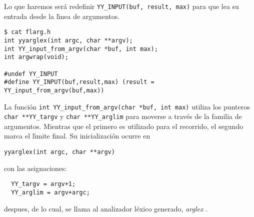 Lo que haremos ser\'a redefinir \verb|YY_INPUT(buf, result, max)| para que
lea su entrada desde la l\'{\i}nea de argumentos.
\begin{verbatim}
$ cat flarg.h
int yyarglex(int argc, char **argv);
int YY_input_from_argv(char *buf, int max);
int argwrap(void);
 
#undef YY_INPUT
#define YY_INPUT(buf,result,max) (result = YY_input_from_argv(buf,max))   
\end{verbatim}
La funci\'on \verb|int YY_input_from_argv(char *buf, int max)| utiliza los punteros
\verb|char **YY_targv| y \verb|char **YY_arglim| para moverse a trav\'es
de la familia de argumentos. Mientras que el primero es utilizado para el
recorrido, el segundo marca el l\'{\i}mite final. Su inicializaci\'on ocurre en

\begin{center}
\verb|yyarglex(int argc, char **argv)|
\end{center}
con las asignaciones:
\begin{verbatim}
  YY_targv = argv+1;
  YY_arglim = argv+argc;
\end{verbatim}

despues, de lo cual, se llama al analizador l\'exico generado, \emph{arglex} .

